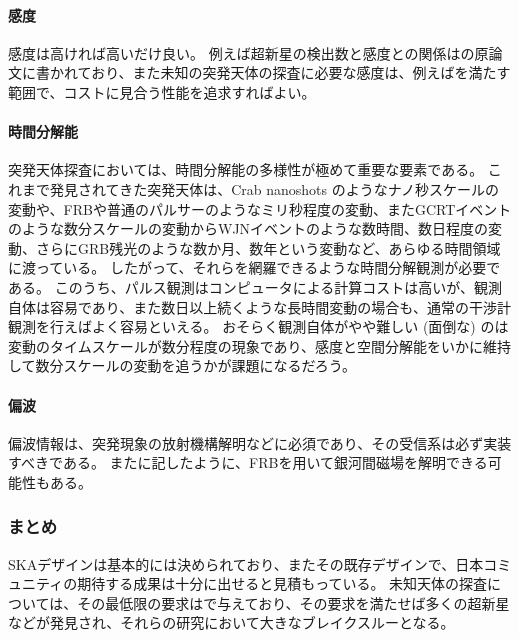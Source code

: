 \paragraph{感度}
感度は高ければ高いだけ良い。
例えば超新星の検出数と感度との関係はの原論文に書かれており、また未知の突発天体の探査に必要な感度は、例えばを満たす範囲で、コストに見合う性能を追求すればよい。

\paragraph{時間分解能}
突発天体探査においては、時間分解能の多様性が極めて重要な要素である。
これまで発見されてきた突発天体は、Crab nanoshots のようなナノ秒スケールの変動や、FRBや普通のパルサーのようなミリ秒程度の変動、またGCRTイベントのような数分スケールの変動からWJNイベントのような数時間、数日程度の変動、さらにGRB残光のような数か月、数年という変動など、あらゆる時間領域に渡っている。
したがって、それらを網羅できるような時間分解観測が必要である。
このうち、パルス観測はコンピュータによる計算コストは高いが、観測自体は容易であり、また数日以上続くような長時間変動の場合も、通常の干渉計観測を行えばよく容易といえる。
おそらく観測自体がやや難しい (面倒な) のは変動のタイムスケールが数分程度の現象であり、感度と空間分解能をいかに維持して数分スケールの変動を追うかが課題になるだろう。

\paragraph{偏波}
偏波情報は、突発現象の放射機構解明などに必須であり、その受信系は必ず実装すべきである。
またに記したように、FRBを用いて銀河間磁場を解明できる可能性もある。

\subsubsection{まとめ}
SKAデザインは基本的には決められており、またその既存デザインで、日本コミュニティの期待する成果は十分に出せると見積もっている。
未知天体の探査については、その最低限の要求はで与えており、その要求を満たせば多くの超新星などが発見され、それらの研究において大きなブレイクスルーとなる。
